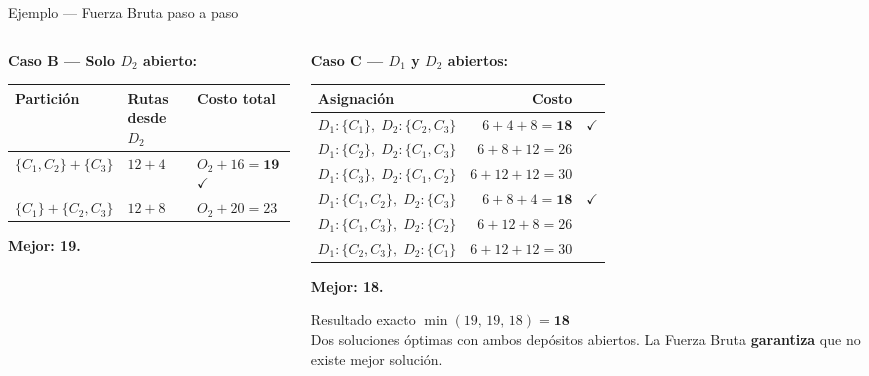 \documentclass[aspectratio=169,10pt]{beamer}
\begin{document}
\begin{frame}{Ejemplo --- Fuerza Bruta paso a paso}
\begin{columns}[T,onlytextwidth]
\begin{column}{0.50\textwidth}
      \vspace{0.5em}
      \textbf{Caso B — Solo $D_2$ abierto:}
      \vspace{0.3em}
      \begin{center}\footnotesize
      \begin{tabular}{lll}
        \toprule
        Partición & Rutas desde $D_2$ & Costo total \\
        \midrule
        $\{C_1,C_2\}+\{C_3\}$ & $12+4$ & $O_2+16=\mathbf{19}$ $\checkmark$ \\
        $\{C_1\}+\{C_2,C_3\}$ & $12+8$ & $O_2+20=23$ \\
        \bottomrule
      \end{tabular}
      \end{center}
      \small \textbf{Mejor: 19.}
    \end{column}
    \begin{column}{0.48\textwidth}
      \textbf{Caso C — $D_1$ y $D_2$ abiertos:}
      \vspace{0.3em}
      \begin{center}\footnotesize
      \begin{tabular}{lrl}
        \toprule
        Asignación & Costo & \\
        \midrule
        $D_1{:}\{C_1\},\; D_2{:}\{C_2,C_3\}$ & $6+4+8=\mathbf{18}$ & $\checkmark$ \\
        $D_1{:}\{C_2\},\; D_2{:}\{C_1,C_3\}$ & $6+8+12=26$ & \\
        $D_1{:}\{C_3\},\; D_2{:}\{C_1,C_2\}$ & $6+12+12=30$ & \\
        $D_1{:}\{C_1,C_2\},\; D_2{:}\{C_3\}$ & $6+8+4=\mathbf{18}$ & $\checkmark$ \\
        $D_1{:}\{C_1,C_3\},\; D_2{:}\{C_2\}$ & $6+12+8=26$ & \\
        $D_1{:}\{C_2,C_3\},\; D_2{:}\{C_1\}$ & $6+12+12=30$ & \\
        \bottomrule
      \end{tabular}
      \end{center}
      \small \textbf{Mejor: 18.}

      \vspace{0.5em}
      \begin{alertblock}{Resultado exacto}\small
        $\min(19,\, 19,\, 18) = \mathbf{18}$\\
        Dos soluciones óptimas con ambos depósitos abiertos.
        La Fuerza Bruta \textbf{garantiza} que no existe mejor solución.
      \end{alertblock}
    \end{column}
  \end{columns}
\end{frame}
\end{document}
